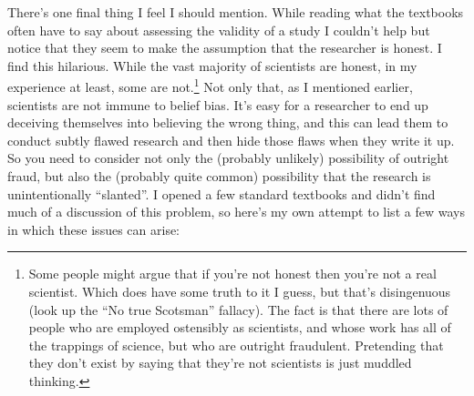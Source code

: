 \documentclass[
  a4paper,
]{book}
\begin{document}
There's one final thing I feel I should mention. While reading what the
textbooks often have to say about assessing the validity of a study I
couldn't help but notice that they seem to make the assumption that the
researcher is honest. I find this hilarious. While the vast majority of
scientists are honest, in my experience at least, some are
not.\footnote{Some people might argue that if you're not honest then
  you're not a real scientist. Which does have some truth to it I guess,
  but that's disingenuous (look up the ``No true Scotsman'' fallacy).
  The fact is that there are lots of people who are employed ostensibly
  as scientists, and whose work has all of the trappings of science, but
  who are outright fraudulent. Pretending that they don't exist by
  saying that they're not scientists is just muddled thinking.} Not only
that, as I mentioned earlier, scientists are not immune to belief bias.
It's easy for a researcher to end up deceiving themselves into believing
the wrong thing, and this can lead them to conduct subtly flawed
research and then hide those flaws when they write it up. So you need to
consider not only the (probably unlikely) possibility of outright fraud,
but also the (probably quite common) possibility that the research is
unintentionally ``slanted''. I opened a few standard textbooks and
didn't find much of a discussion of this problem, so here's my own
attempt to list a few ways in which these issues can arise:
\end{document}
